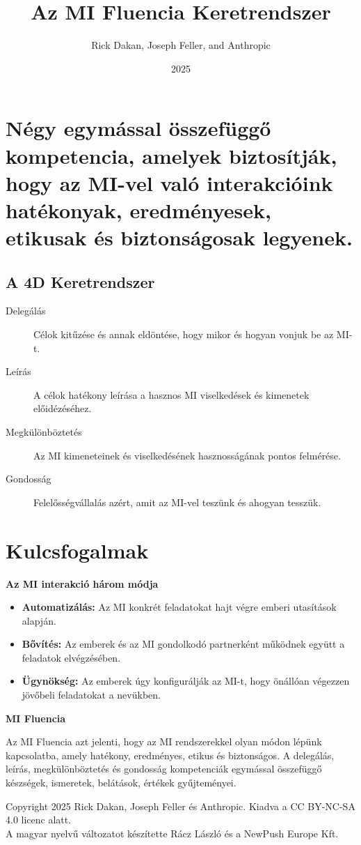 \documentclass[a4paper, 11pt]{article}
\makeatletter
\renewcommand{\maketitle}{
  \begin{center}
    {\fontsize{22}{26}\bfseries\color{primary}\@title}
    \vspace{0.5em}
    {\color{lightgray}\titlerule[3pt]}
    \vspace{1.5em}
  \end{center}
}
\makeatother
\begin{document}
\title{Az MI Fluencia Keretrendszer}
\author{Rick Dakan, Joseph Feller, and Anthropic}
\date{2025}
\maketitle

\section*{Négy egymással összefüggő kompetencia, amelyek biztosítják, hogy az MI-vel való interakcióink hatékonyak, eredményesek, etikusak és biztonságosak legyenek.}

\subsection*{A 4D Keretrendszer}
\begin{description}
    \item[Delegálás] Célok kitűzése és annak eldöntése, hogy mikor és hogyan vonjuk be az MI-t.
    \item[Leírás] A célok hatékony leírása a hasznos MI viselkedések és kimenetek előidézéséhez.
    \item[Megkülönböztetés] Az MI kimeneteinek és viselkedésének hasznosságának pontos felmérése.
    \item[Gondosság] Felelősségvállalás azért, amit az MI-vel teszünk és ahogyan tesszük.
\end{description}

\section*{Kulcsfogalmak}
\begin{description}
    \item \textbf{Az MI interakció három módja}
    \begin{itemize}
        \item \textbf{Automatizálás:} Az MI konkrét feladatokat hajt végre emberi utasítások alapján.
        \item \textbf{Bővítés:} Az emberek és az MI gondolkodó partnerként működnek együtt a feladatok elvégzésében.
        \item \textbf{Ügynökség:} Az emberek úgy konfigurálják az MI-t, hogy önállóan végezzen jövőbeli feladatokat a nevükben.
    \end{itemize}
    \item \textbf{MI Fluencia}
    
    Az MI Fluencia azt jelenti, hogy az MI rendszerekkel olyan módon lépünk kapcsolatba, amely hatékony, eredményes, etikus és biztonságos. A delegálás, leírás, megkülönböztetés és gondosság kompetenciák egymással összefüggő készségek, ismeretek, belátások, értékek gyűjteményei. 
\end{description}

\vspace{\fill}
\begin{center}
    \small{Copyright 2025 Rick Dakan, Joseph Feller és Anthropic. Kiadva a CC BY-NC-SA 4.0 licenc alatt.\\A magyar nyelvű változatot készítette Rácz László és a NewPush Europe Kft.}
\end{center}
\end{document}
